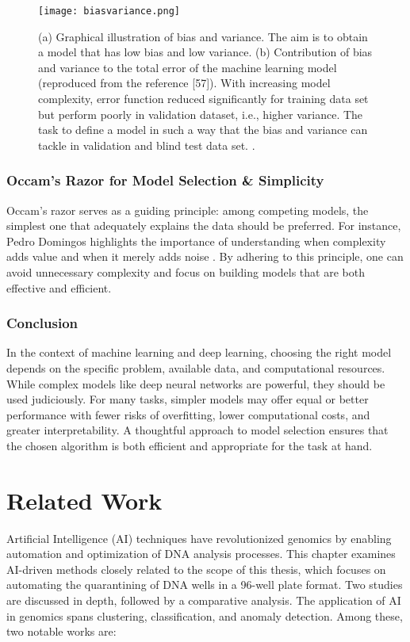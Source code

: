\begin{figure}[H]
    \centering
    \texttt{[image: biasvariance.png]}
    \caption{(a) Graphical illustration of bias and variance. The aim is to obtain a model that has low bias and low variance. (b) Contribution of bias and variance to the total error of the machine learning model (reproduced from the reference [57]). With increasing model complexity, error function reduced significantly for training data set but perform poorly in validation dataset, i.e., higher variance. The task to define a model in such a way that the bias and variance can tackle in validation and blind test data set. \cite{bias_variance_illustration}.}
    \label{fig:biasvariance}
    \end{figure}

\subsubsection{Occam's Razor for Model Selection \& Simplicity}
Occam's razor \cite{britannica_occams_razor} serves as a guiding principle: among competing models, the simplest one that adequately explains the data should be preferred. For instance, Pedro Domingos highlights the importance of understanding when complexity adds value and when it merely adds noise \cite{domingos2012few}.
By adhering to this principle, one can avoid unnecessary complexity and focus on building models that are both effective and efficient.

\subsubsection{Conclusion}

In the context of machine learning and deep learning, choosing the right model depends on the specific problem, available data, and computational resources. While complex models like deep neural networks are powerful, they should be used judiciously. For many tasks, simpler models may offer equal or better performance with fewer risks of overfitting, lower computational costs, and greater interpretability. A thoughtful approach to model selection ensures that the chosen algorithm is both efficient and appropriate for the task at hand.

\section{Related Work}
Artificial Intelligence (AI) techniques have revolutionized genomics by enabling automation and optimization of DNA analysis processes. This chapter examines AI-driven methods closely related to the scope of this thesis, which focuses on automating the quarantining of DNA wells in a 96-well plate format. Two studies are discussed in depth, followed by a comparative analysis.
The application of AI in genomics spans clustering, classification, and anomaly detection. Among these, two notable works are:

